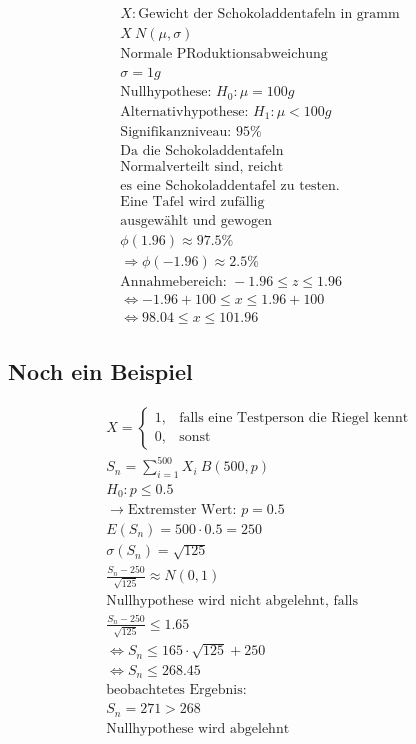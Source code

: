 \begin{align*}
    X: \text{Gewicht der Schokoladdentafeln in gramm} \\
    X ~ N(\mu, \sigma) \\
    \text{Normale PRoduktionsabweichung }\\
    \sigma = 1g \\
    \text{Nullhypothese: } H_0: \mu = 100g \\
    \text{Alternativhypothese: } H_1: \mu < 100g \\
    \text{Signifikanzniveau: } 95\% \\
    \text{Da die Schokoladdentafeln} \\
    \text{Normalverteilt sind, reicht} \\
    \text{es eine Schokoladdentafel zu testen.} \\
    \text{Eine Tafel wird zufällig} \\
    \text{ausgewählt und gewogen} \\
    \phi(1.96) \approx 97.5\% \\
    \Rightarrow \phi(-1.96) \approx 2.5\% \\
    \text{Annahmebereich: } -1.96 \leq z \leq 1.96 \\
    \Leftrightarrow -1.96 + 100 \leq x \leq 1.96 + 100 \\
    \Leftrightarrow 98.04 \leq x \leq 101.96 
\end{align*}

\subsection{Noch ein Beispiel}

\begin{align*}
    X = \begin{cases}
        1, & \text{falls eine Testperson die Riegel kennt} \\
        0,& \text{sonst}
    \end{cases} \\
    S_n = \sum_{i = 1}^{500} X_i ~ B(500, p) \\
    H_0: p \leq 0.5 \\
    \rightarrow \text{Extremster Wert: } p = 0.5 \\
    E(S_n) = 500 \cdot 0.5 = 250 \\
    \sigma(S_n) = \sqrt{125} \\
    \frac{S_n - 250}{\sqrt{125}} \approx N(0, 1) \\
    \text{Nullhypothese wird nicht abgelehnt, falls} \\
    \frac{S_n - 250}{\sqrt{125}} \leq 1.65 \\
    \Leftrightarrow S_n \leq 165 \cdot \sqrt{125} + 250 \\
    \Leftrightarrow S_n \leq 268.45 \\
    \text{beobachtetes Ergebnis:} \\
    S_n = 271 > 268 \\
    \text{Nullhypothese wird abgelehnt}
\end{align*}